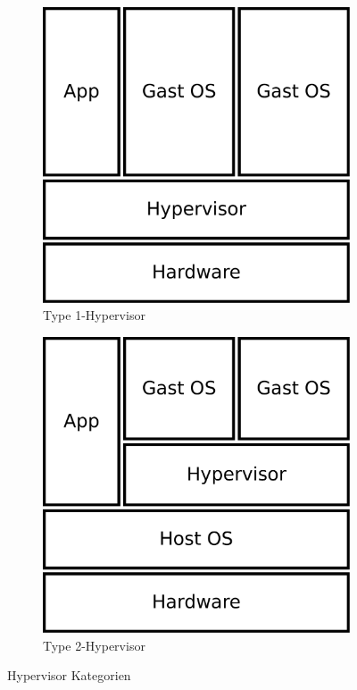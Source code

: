 \documentclass[
  a4paper,					    %
  twoside,
  DIV=calc,     				%
  bibliography=totoc,
  cleardoublepage=empty,
  ngerman,     					%
  final       					%
]{scrbook}
\begin{document}
\begin{figure}
    \centering
    \begin{subfigure}[b]{0.4\textwidth}
        \centering
        \includegraphics[width=\textwidth]{virt_type1}
        \caption{Type 1-Hypervisor}
        \label{fig:hypervisor_type1}
    \end{subfigure}
    \qquad
    \begin{subfigure}[b]{0.4\textwidth}
        \centering
        \includegraphics[width=\textwidth]{virt_type2}
        \caption{Type 2-Hypervisor}
        \label{fig:hypervisor_type2}
    \end{subfigure}
    \caption{Hypervisor Kategorien}\label{fig:hypervisor}
\end{figure}
\end{document}
